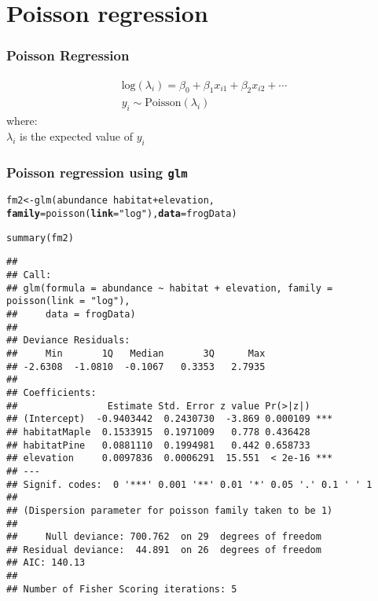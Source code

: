 \documentclass[color=usenames,dvipsnames]{beamer}\usepackage[]{graphicx}\usepackage[]{color}
\makeatletter
\newcommand{\hlstr}[1]{\textcolor[rgb]{0.749,0.012,0.012}{#1}}%
\newcommand{\hlopt}[1]{\textcolor[rgb]{0,0,0}{#1}}%
\newcommand{\hlstd}[1]{\textcolor[rgb]{0,0,0}{#1}}%
\newcommand{\hlkwb}[1]{\textcolor[rgb]{0,0.341,0.682}{#1}}%
\newcommand{\hlkwc}[1]{\textcolor[rgb]{0,0,0}{\textbf{#1}}}%
\newcommand{\hlkwd}[1]{\textcolor[rgb]{0.004,0.004,0.506}{#1}}%
\newenvironment{kframe}{%
 \def\at@end@of@kframe{}%
 \ifinner\ifhmode%
  \def\at@end@of@kframe{\end{minipage}}%
  \begin{minipage}{\columnwidth}%
 \fi\fi%
 \def\FrameCommand##1{\hskip\@totalleftmargin \hskip-\fboxsep
 \colorbox{shadecolor}{##1}\hskip-\fboxsep
     \hskip-\linewidth \hskip-\@totalleftmargin \hskip\columnwidth}%
 \MakeFramed {\advance\hsize-\width
   \@totalleftmargin\z@ \linewidth\hsize
   \@setminipage}}%
 {\par\unskip\endMakeFramed%
 \at@end@of@kframe}
\newenvironment{knitrout}{}{} %
\makeatother
\begin{document}
\section{Poisson regression}



\begin{frame}
  \frametitle{Poisson Regression}
    \begin{gather*}
      \mathrm{log}(\lambda_i) = \beta_0 + \beta_1 x_{i1} + \beta_2 x_{i2} + \cdots \\
      y_i \sim \mathrm{Poisson}(\lambda_i)
  \end{gather*}
  \pause
  {%
    where: \\}
  $\lambda_i$ is the expected value of $y_i$
\end{frame}







\begin{frame}[fragile]
  \frametitle{Poisson regression using {\tt glm}}
\begin{knitrout}\tiny
{}\color{fgcolor}\begin{kframe}
\begin{alltt}
\hlstd{fm2} \hlkwb{<-} \hlkwd{glm}\hlstd{(abundance} \hlopt{~} \hlstd{habitat} \hlopt{+} \hlstd{elevation,}
           \hlkwc{family}\hlstd{=}\hlkwd{poisson}\hlstd{(}\hlkwc{link}\hlstd{=}\hlstr{"log"}\hlstd{),} \hlkwc{data}\hlstd{=frogData)}
\end{alltt}
\end{kframe}
\end{knitrout}
\pause
\begin{knitrout}\tiny
{}\color{fgcolor}\begin{kframe}
\begin{alltt}
\hlkwd{summary}\hlstd{(fm2)}
\end{alltt}
\begin{verbatim}
## 
## Call:
## glm(formula = abundance ~ habitat + elevation, family = poisson(link = "log"), 
##     data = frogData)
## 
## Deviance Residuals: 
##     Min       1Q   Median       3Q      Max  
## -2.6308  -1.0810  -0.1067   0.3353   2.7935  
## 
## Coefficients:
##                Estimate Std. Error z value Pr(>|z|)    
## (Intercept)  -0.9403442  0.2430730  -3.869 0.000109 ***
## habitatMaple  0.1533915  0.1971009   0.778 0.436428    
## habitatPine   0.0881110  0.1994981   0.442 0.658733    
## elevation     0.0097836  0.0006291  15.551  < 2e-16 ***
## ---
## Signif. codes:  0 '***' 0.001 '**' 0.01 '*' 0.05 '.' 0.1 ' ' 1
## 
## (Dispersion parameter for poisson family taken to be 1)
## 
##     Null deviance: 700.762  on 29  degrees of freedom
## Residual deviance:  44.891  on 26  degrees of freedom
## AIC: 140.13
## 
## Number of Fisher Scoring iterations: 5
\end{verbatim}
\end{kframe}
\end{knitrout}
\end{frame}
\end{document}
